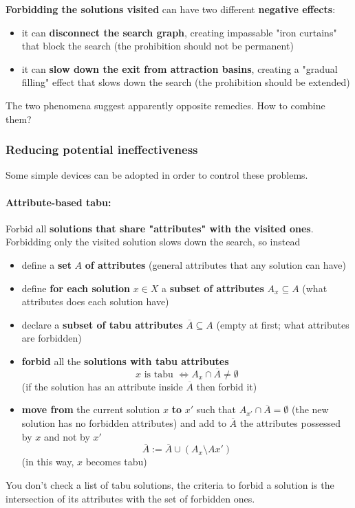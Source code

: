 \textbf{Forbidding the solutions visited} can have two different \textbf{negative effects}:
\begin{itemize}
	\item it can \textbf{disconnect the search graph}, creating impassable "iron curtains" that block the search (the prohibition should not be permanent)
	
	\item it can \textbf{slow down the exit from attraction basins}, creating a "gradual filling" effect that slows down the search (the prohibition should be extended)
\end{itemize}

The two phenomena suggest apparently opposite remedies. How to combine them? \\

\newpage

\subsubsection{Reducing potential ineffectiveness}

Some simple devices can be adopted in order to control these problems.\\

\paragraph{Attribute-based tabu:} Forbid all \textbf{solutions that share "attributes" with the visited ones}.\\

Forbidding only the visited solution slows down the search, so instead
\begin{itemize}
	\item define a \textbf{set} $A$ \textbf{of attributes} (general attributes that any solution can have)
	
	\item define \textbf{for each solution} $x \in X$ a \textbf{subset of attributes} $A_x \subseteq A$ (what attributes does each solution have)
	
	\item declare a \textbf{subset of tabu attributes} $\overline{A} \subseteq A$ (empty at first; what attributes are forbidden)
	
	\item \textbf{forbid} all the \textbf{solutions with tabu attributes}
	$$ x \text{ is tabu } \Leftrightarrow A_x \cap \overline{A} \neq \emptyset $$
	(if the solution has an attribute inside $\overline{A}$ then forbid it)
	
	\item \textbf{move from} the current solution $x$ \textbf{to} $x'$ such that $A_{x'} \cap \overline{A} = \emptyset$ (the new solution has no forbidden attributes) and add to $\overline{A}$ the attributes possessed by $x$ and not by $x'$
	$$ \overline{A} := \overline{A} \cup (A_x \setminus A{x'} ) $$
	(in this way, $x$ becomes tabu)
\end{itemize}
You don't check a list of tabu solutions, the criteria to forbid a solution is the intersection of its attributes with the set of forbidden ones.\\

